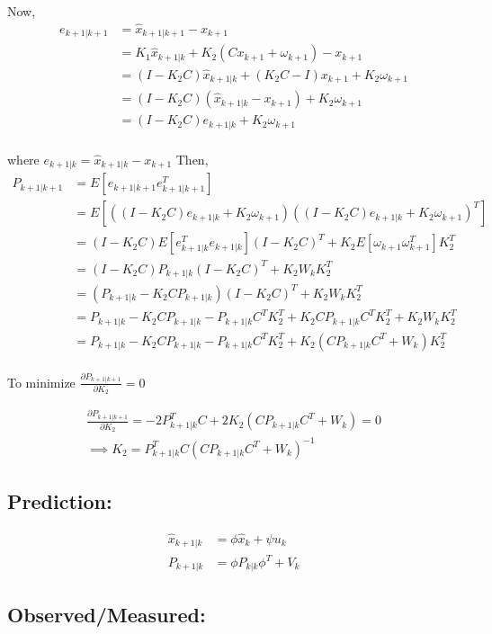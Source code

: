 \documentclass[12pt]{article}
\begin{document}
Now, 
\begin{align*}
e_{k+1|k+1} &= \hat{x}_{k+1|k+1} - x_{k+1}\\
&= K_1 \hat{x}_{k+1|k} +K_2(Cx_{k+1}+\omega_{k+1}) - x_{k+1}\\
&= (I-K_2C)\hat{x}_{k+1|k} +(K_2C-I)x_{k+1} + K_2\omega_{k+1}\\
&= (I-K_2C)(\hat{x}_{k+1|k}-x_{k+1}) + K_2\omega_{k+1}\\
&= (I-K_2C)e_{k+1|k} + K_2\omega_{k+1}\\
\end{align*}

where $e_{k+1|k} = \hat{x}_{k+1|k}-x_{k+1}$
Then,
\begin{align*}
P_{k+1|k+1} &= E[e_{k+1|k+1}e_{k+1|k+1}^T] \\
&= E[((I-K_2C)e_{k+1|k} + K_2\omega_{k+1}) ((I-K_2C)e_{k+1|k} + K_2\omega_{k+1})^T ]\\
&= (I-K_2C)E[e_{k+1|k}^Te_{k+1|k}] (I-K_2C)^T + K_2E[\omega_{k+1}\omega_{k+1}^T]K_2^T\\
&= (I-K_2C)P_{k+1|k}(I-K_2C)^T + K_2W_kK_2^T\\
&= (P_{k+1|k} - K_2CP_{k+1|k}) (I-K_2C)^T+K_2W_kK_2^T\\
&= P_{k+1|k} - K_2CP_{k+1|k} - P_{k+1|k}C^TK_2^T + K_2CP_{k+1|k}C^TK_2^T + K_2W_kK_2^T\\
&= P_{k+1|k} - K_2CP_{k+1|k} - P_{k+1|k}C^TK_2^T + K_2( CP_{k+1|k}C^T + W_k)K_2^T\\
\end{align*}

To minimize $\frac{\partial P_{k+1|k+1}}{\partial K_2} =0$

\begin{align*}
\frac{\partial P_{k+1|k+1}}{\partial K_2}  = -2 P_{k+1|k}^TC + 2K_2(CP_{k+1|k}C^T + W_k) = 0\\
\implies K_2 = P_{k+1|k}^TC(CP_{k+1|k}C^T + W_k)^{-1}
\end{align*}

\subsection*{Prediction:}

\begin{align*}
\hat{x}_{k+1|k} &= \phi \hat{x}_k + \psi u_k\\
P_{k+1|k} &= \phi P_{k|k} \phi^T + V_k
\end{align*}

\subsection*{Observed/Measured:}
\end{document}
